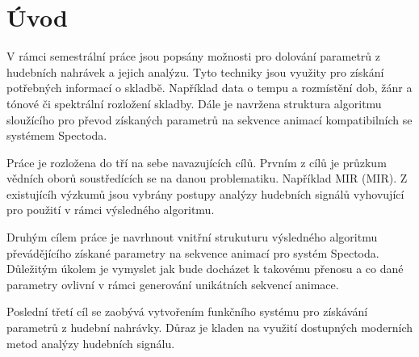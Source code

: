 \chapter*{Úvod}
{}

V rámci semestrální práce jsou popsány možnosti pro dolování parametrů z hudebních nahrávek a jejich analýzu.
Tyto techniky jsou využity pro získání potřebných informací o skladbě.
Například data o tempu a rozmístění dob, žánr a tónové či spektrální rozložení skladby.
Dále je navržena struktura algoritmu sloužícího pro převod získaných parametrů na sekvence animací kompatibilních se systémem Spectoda.

Práce je rozložena do tří na sebe navazujících cílů.
Prvním z cílů je průzkum vědních oborů soustředících se na danou problematiku. Například \acs{MIR} (\acl{MIR}).
Z existujícíh výzkumů jsou vybrány postupy analýzy hudebních signálů vyhovující pro použití v rámci výsledného algoritmu.

Druhým cílem práce je navrhnout vnitřní strukuturu výsledného algoritmu převádějícího získané parametry na sekvence animací pro systém Spectoda.
Důležitým úkolem je vymyslet jak bude docházet k takovému přenosu a co dané parametry ovlivní v rámci generování unikátních sekvencí animace.

Poslední třetí cíl se zaobývá vytvořením funkčního systému pro získávání parametrů z hudební nahrávky.
Důraz je kladen na využití dostupných moderních metod analýzy hudebních signálu.
